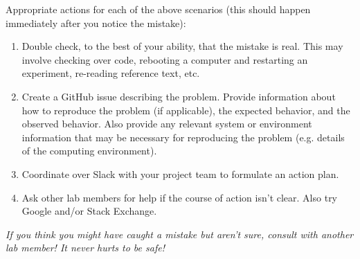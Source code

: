 \documentclass{tufte-book} %
\begin{document}
Appropriate actions for each of the above scenarios (this should
happen immediately after you notice the mistake):
\begin{enumerate}
\item Double check, to the best of your ability, that the mistake is
  real.  This may involve checking over code, rebooting a computer and
  restarting an experiment, re-reading reference text, etc.
\item Create a GitHub issue describing the problem.  Provide
  information about how to reproduce the problem (if applicable), the
  expected behavior, and the observed behavior.  Also provide any
  relevant system or environment information that may be necessary for
  reproducing the problem (e.g. details of the computing environment).
\item Coordinate over Slack with your project team to formulate an
  action plan.
\item Ask other lab members for help if the course of action isn't
  clear.  Also try Google and/or Stack Exchange.
\end{enumerate}

\noindent \textit{If you think you might have caught a mistake but aren't
  sure, consult with another lab member! It never hurts to be safe!}



\end{document}
